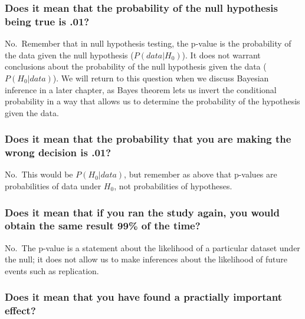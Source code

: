 \documentclass[12pt,]{book}
\theoremstyle{definition}
\theoremstyle{definition}
\theoremstyle{definition}
\theoremstyle{remark}
\begin{document}
\hypertarget{does-it-mean-that-the-probability-of-the-null-hypothesis-being-true-is-.01}{%
\subsubsection{Does it mean that the probability of the null hypothesis being true is .01?}\label{does-it-mean-that-the-probability-of-the-null-hypothesis-being-true-is-.01}}

No.~Remember that in null hypothesis testing, the p-value is the probability of the data given the null hypothesis (\(P(data|H_0)\)). It does not warrant conclusions about the probability of the null hypothesis given the data (\(P(H_0|data)\)). We will return to this question when we discuss Bayesian inference in a later chapter, as Bayes theorem lets us invert the conditional probability in a way that allows us to determine the probability of the hypothesis given the data.

\hypertarget{does-it-mean-that-the-probability-that-you-are-making-the-wrong-decision-is-.01}{%
\subsubsection{Does it mean that the probability that you are making the wrong decision is .01?}\label{does-it-mean-that-the-probability-that-you-are-making-the-wrong-decision-is-.01}}

No.~This would be \(P(H_0|data)\), but remember as above that p-values are probabilities of data under \(H_0\), not probabilities of hypotheses.

\hypertarget{does-it-mean-that-if-you-ran-the-study-again-you-would-obtain-the-same-result-99-of-the-time}{%
\subsubsection{Does it mean that if you ran the study again, you would obtain the same result 99\% of the time?}\label{does-it-mean-that-if-you-ran-the-study-again-you-would-obtain-the-same-result-99-of-the-time}}

No.~The p-value is a statement about the likelihood of a particular dataset under the null; it does not allow us to make inferences about the likelihood of future events such as replication.

\hypertarget{does-it-mean-that-you-have-found-a-practially-important-effect}{%
\subsubsection{Does it mean that you have found a practially important effect?}\label{does-it-mean-that-you-have-found-a-practially-important-effect}}
\end{document}
